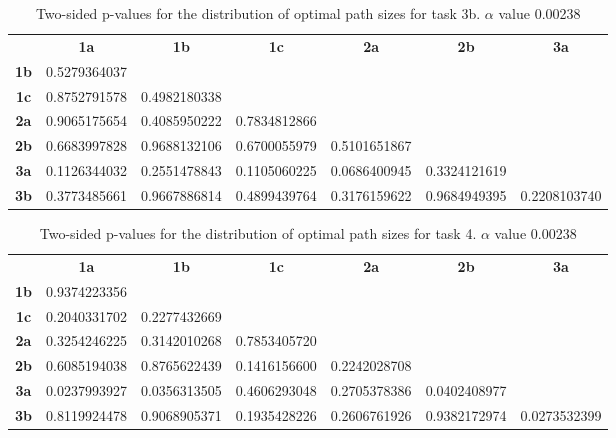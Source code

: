 \begin{table}[h!]
    \centering
    \begin{tabular}{ccccccc}
                & \textbf{1a}  & \textbf{1b}  & \textbf{1c}  & \textbf{2a}  & \textbf{2b}  & \textbf{3a}  \\
    \textbf{1b} & 0.5279364037 &              &              &              &              &              \\
    \textbf{1c} & 0.8752791578 & 0.4982180338 &              &              &              &              \\
    \textbf{2a} & 0.9065175654 & 0.4085950222 & 0.7834812866 &              &              &              \\
    \textbf{2b} & 0.6683997828 & 0.9688132106 & 0.6700055979 & 0.5101651867 &              &              \\
    \textbf{3a} & 0.1126344032 & 0.2551478843 & 0.1105060225 & 0.0686400945 & 0.3324121619 &              \\
    \textbf{3b} & 0.3773485661 & 0.9667886814 & 0.4899439764 & 0.3176159622 & 0.9684949395 & 0.2208103740
    \end{tabular}
    \caption{Two-sided p-values for the distribution of optimal path sizes for task 3b. \(\alpha\) value 0.00238}
    \label{tab:exp2.pathsize3b}
\end{table}

\begin{table}[h!]
    \centering
    \begin{tabular}{ccccccc}
                & \textbf{1a}  & \textbf{1b}  & \textbf{1c}  & \textbf{2a}  & \textbf{2b}  & \textbf{3a}  \\
    \textbf{1b} & 0.9374223356 &              &              &              &              &              \\
    \textbf{1c} & 0.2040331702 & 0.2277432669 &              &              &              &              \\
    \textbf{2a} & 0.3254246225 & 0.3142010268 & 0.7853405720 &              &              &              \\
    \textbf{2b} & 0.6085194038 & 0.8765622439 & 0.1416156600 & 0.2242028708 &              &              \\
    \textbf{3a} & 0.0237993927 & 0.0356313505 & 0.4606293048 & 0.2705378386 & 0.0402408977 &              \\
    \textbf{3b} & 0.8119924478 & 0.9068905371 & 0.1935428226 & 0.2606761926 & 0.9382172974 & 0.0273532399
    \end{tabular}
    \caption{Two-sided p-values for the distribution of optimal path sizes for task 4. \(\alpha\) value 0.00238}
    \label{tab:exp2.pathsize4}
\end{table}

\newpage